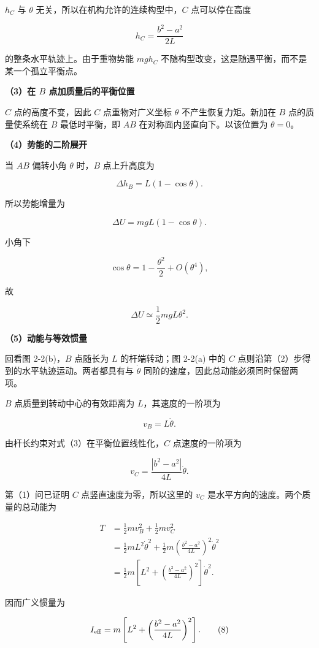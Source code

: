 \documentclass[12pt,a4paper,UTF8]{ctexart}
\begin{document}
\(h_C\) 与 \(\theta\) 无关，所以在机构允许的连续构型中，\(C\)
点可以停在高度

\[
\boxed{h_C=\frac{b^2-a^2}{2L}}
\]

的整条水平轨迹上。由于重物势能 \(mgh_C\)
不随构型改变，这是随遇平衡，而不是某一个孤立平衡点。

\textbf{（3）在 \(B\) 点加质量后的平衡位置}

\(C\) 点的高度不变，因此 \(C\) 点重物对广义坐标 \(\theta\)
不产生恢复力矩。新加在 \(B\) 点的质量使系统在 \(B\) 最低时平衡，即
\(AB\) 在对称面内竖直向下。以该位置为 \(\theta=0\)。

\textbf{（4）势能的二阶展开}

当 \(AB\) 偏转小角 \(\theta\) 时，\(B\) 点上升高度为

\[
\Delta h_B=L(1-\cos\theta).
\]

所以势能增量为

\[
\Delta U=mgL(1-\cos\theta).
\]

小角下

\[
\cos\theta=1-\frac{\theta^2}{2}+O(\theta^4),
\]

故

\[
\boxed{
\Delta U\simeq\frac12mgL\theta^2
}.\tag{6}
\]

\textbf{（5）动能与等效惯量}

回看图 2-2(b)，\(B\) 点随长为 \(L\) 的杆端转动；图 2-2(a) 中的 \(C\)
点则沿第（2）步得到的水平轨迹运动。两者都具有与 \(\dot\theta\)
同阶的速度，因此总动能必须同时保留两项。

\(B\) 点质量到转动中心的有效距离为 \(L\)，其速度的一阶项为

\[
v_B=L\dot\theta.
\]

由杆长约束对式（3）在平衡位置线性化，\(C\) 点速度的一阶项为

\[
v_C=\frac{|b^2-a^2|}{4L}\dot\theta.
\]

第（1）问已证明 \(C\) 点竖直速度为零，所以这里的 \(v_C\)
是水平方向的速度。两个质量的总动能为

\[
\begin{aligned}
T
&=\frac12mv_B^2+\frac12mv_C^2\\
&=\frac12mL^2\dot\theta^2
+\frac12m\left(\frac{b^2-a^2}{4L}\right)^2\dot\theta^2\\
&=\frac12m
\left[
L^2+\left(\frac{b^2-a^2}{4L}\right)^2
\right]\dot\theta^2.
\end{aligned}\tag{7}
\]

因而广义惯量为

\[
I_{\rm eff}=m
\left[
L^2+\left(\frac{b^2-a^2}{4L}\right)^2
\right].\tag{8}
\]
\end{document}
